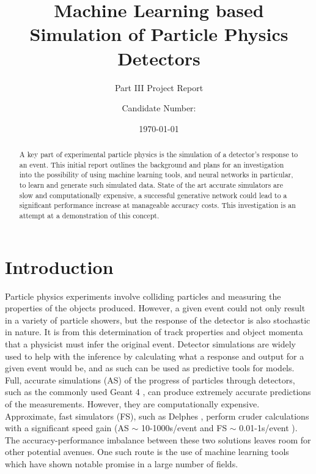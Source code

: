 \documentclass{report}
\title{Machine Learning based Simulation of Particle Physics Detectors}
\subtitle{Part III Project Report}
\author{Candidate Number: }
\date{\today}
\begin{document}
	
\begin{titlepage}
\maketitle


%
%
%

\end{titlepage}

\begin{abstract}
A key part of experimental particle physics is the simulation of a detector's response to an event. This initial report outlines the background and plans for an investigation into the possibility of using machine learning tools, and neural networks in particular, to learn and generate such simulated data. State of the art accurate simulators are slow and computationally expensive, a successful generative network could lead to a significant performance increase at manageable accuracy costs. This investigation is an attempt at a demonstration of this concept.
\end{abstract}

\chapter{Introduction}

Particle physics experiments involve colliding particles and measuring the properties of the objects produced. However, a given event could not only result in a variety of particle showers, but the response of the detector is also stochastic in nature. It is from this determination of track properties and object momenta that a physicist must infer the original event. Detector simulations are widely used to help with the inference by calculating what a response and output for a given event would be, and as such can be used as predictive tools for models.\\

Full, accurate simulations (AS) of the progress of particles through detectors, such as the commonly used Geant 4 \cite{geant4}, can produce extremely accurate predictions of the measurements. However, they are computationally expensive. Approximate, fast simulators (FS), such as Delphes \cite{delphes}, perform cruder calculations with a significant speed gain (AS $\sim$ 10-1000s/event and FS $\sim$ 0.01-1s/event \cite{delphessl}). The accuracy-performance imbalance between these two solutions leaves room for other potential avenues. One such route is the use of machine learning tools which have shown notable promise in a large number of fields.\\
\end{document}
